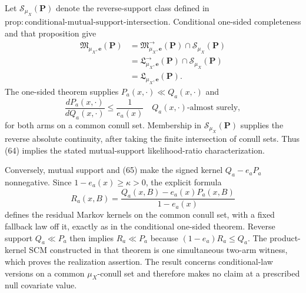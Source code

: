 Let \(\mathcal S_{\mu_X}(\boldsymbol P)\) denote the reverse-support class defined in \(\mathrm{prop:conditional\text{-}mutual\text{-}support\text{-}intersection}\).  Conditional one-sided completeness and that proposition give
\[
 \begin{aligned}
 \mathfrak M_{\mu_X,\boldsymbol e}(\boldsymbol P)
 &=\mathfrak M^{\to}_{\mu_X,\boldsymbol e}(\boldsymbol P)
   \cap\mathcal S_{\mu_X}(\boldsymbol P)\\
 &=\mathfrak L^{\to}_{\mu_X,\boldsymbol e}(\boldsymbol P)
   \cap\mathcal S_{\mu_X}(\boldsymbol P)\\
 &=\mathfrak L_{\mu_X,\boldsymbol e}(\boldsymbol P).
 \end{aligned} \tag{64}
\]
The one-sided theorem supplies \(P_a(x,\cdot)\ll Q_a(x,\cdot)\) and
\[
 \frac{dP_a(x,\cdot)}{dQ_a(x,\cdot)}\le\frac1{e_a(x)}
 \quad Q_a(x,\cdot)\text{-almost surely}, \tag{65}
\]
for both arms on a common conull set.  Membership in \(\mathcal S_{\mu_X}(\boldsymbol P)\) supplies the reverse absolute continuity, after taking the finite intersection of conull sets.  Thus (64) implies the stated mutual-support likelihood-ratio characterization.

Conversely, mutual support and (65) make the signed kernel \(Q_a-e_aP_a\) nonnegative.  Since \(1-e_a(x)\ge\kappa>0\), the explicit formula
\[
 R_a(x,B)=\frac{Q_a(x,B)-e_a(x)P_a(x,B)}{1-e_a(x)}
\]
defines the residual Markov kernels on the common conull set, with a fixed fallback law off it, exactly as in the conditional one-sided theorem.  Reverse support \(Q_a\ll P_a\) then implies \(R_a\ll P_a\) because \((1-e_a)R_a\le Q_a\).  The product-kernel SCM constructed in that theorem is one simultaneous two-arm witness, which proves the realization assertion.  The result concerns conditional-law versions on a common \(\mu_X\)-conull set and therefore makes no claim at a prescribed null covariate value.